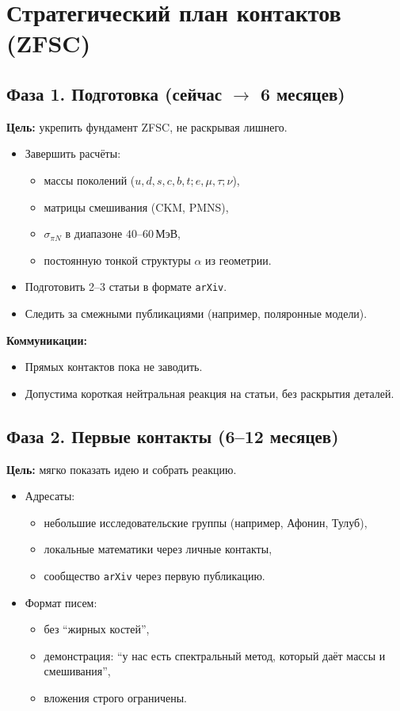 \documentclass[a4paper,12pt]{article}
\begin{document}
\section*{Стратегический план контактов (ZFSC)}

\subsection*{Фаза 1. Подготовка (сейчас $\to$ 6 месяцев)}
\textbf{Цель:} укрепить фундамент ZFSC, не раскрывая лишнего.
\begin{itemize}
  \item Завершить расчёты:
    \begin{itemize}
      \item массы поколений ($u,d,s,c,b,t; e,\mu,\tau; \nu$),
      \item матрицы смешивания (CKM, PMNS),
      \item $\sigma_{\pi N}$ в диапазоне $40\text{--}60\,\text{МэВ}$,
      \item постоянную тонкой структуры $\alpha$ из геометрии.
    \end{itemize}
  \item Подготовить 2--3 статьи в формате \texttt{arXiv}.
  \item Следить за смежными публикациями (например, поляронные модели).
\end{itemize}

\textbf{Коммуникации:}
\begin{itemize}
  \item Прямых контактов пока не заводить.
  \item Допустима короткая нейтральная реакция на статьи, без раскрытия деталей.
\end{itemize}

\subsection*{Фаза 2. Первые контакты (6--12 месяцев)}
\textbf{Цель:} мягко показать идею и собрать реакцию.
\begin{itemize}
  \item Адресаты:
    \begin{itemize}
      \item небольшие исследовательские группы (например, Афонин, Тулуб),
      \item локальные математики через личные контакты,
      \item сообщество \texttt{arXiv} через первую публикацию.
    \end{itemize}
  \item Формат писем:
    \begin{itemize}
      \item без ``жирных костей'',
      \item демонстрация: ``у нас есть спектральный метод, который даёт массы и смешивания'',
      \item вложения строго ограничены.
    \end{itemize}
\end{itemize}
\end{document}
